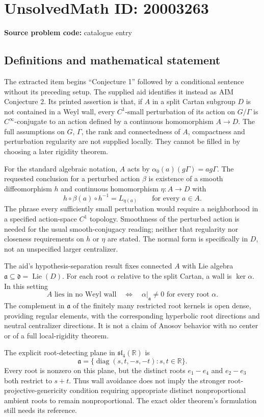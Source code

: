 \documentclass[11pt]{article}
\newcommand{\R}{\mathbb{R}}
\begin{document}
\section*{UnsolvedMath ID: 20003263}
\textbf{Source problem code:} catalogue entry
\subsection{Definitions and mathematical statement}
The extracted item begins ``Conjecture 1'' followed by a conditional sentence without its preceding setup. The supplied aid identifies it instead as AIM Conjecture 2. Its printed assertion is that, if $A$ in a split Cartan subgroup $D$ is not contained in a Weyl wall, every $C^1$-small perturbation of its action on $G/\Gamma$ is $C^\infty$-conjugate to an action defined by a continuous homomorphism $A\to D$. The full assumptions on $G$, $\Gamma$, the rank and connectedness of $A$, compactness and perturbation regularity are not supplied locally. They cannot be filled in by choosing a later rigidity theorem.

For the standard algebraic notation, $A$ acts by $\alpha_0(a)(g\Gamma)=ag\Gamma$. The requested conclusion for a perturbed action $\beta$ is existence of a smooth diffeomorphism $h$ and continuous homomorphism $\eta:A\to D$ with
\[
 h\circ\beta(a)\circ h^{-1}=L_{\eta(a)}
 \qquad\text{for every }a\in A.
\]
The phrase every sufficiently small perturbation would require a neighborhood in a specified action-space $C^1$ topology. Smoothness of the perturbed action is needed for the usual smooth-conjugacy reading; neither that regularity nor closeness requirements on $h$ or $\eta$ are stated. The normal form is specifically in $D$, not an unspecified larger centralizer.

The aid's hypothesis-separation result fixes connected $A$ with Lie algebra $\mathfrak a\subseteq\mathfrak d=\operatorname{Lie}(D)$. For each root $\alpha$ relative to the split Cartan, a wall is $\ker\alpha$. In this setting
\[
 A\text{ lies in no Weyl wall}
 \quad\Longleftrightarrow\quad
 \alpha|_{\mathfrak a}\ne0\text{ for every root }\alpha.
\]
The complement in $\mathfrak a$ of the finitely many restricted root kernels is open dense, providing regular elements, with the corresponding hyperbolic root directions and neutral centralizer directions. It is not a claim of Anosov behavior with no center or of a full local-rigidity theorem.

The explicit root-detecting plane in $\mathfrak{sl}_4(\R)$ is
\[
 \mathfrak a=\{\operatorname{diag}(s,t,-s,-t):s,t\in\R\}.
\]
Every root is nonzero on this plane, but the distinct roots $e_1-e_4$ and $e_2-e_3$ both restrict to $s+t$. Thus wall avoidance does not imply the stronger root-projective-genericity condition requiring appropriate distinct nonproportional ambient roots to remain nonproportional. The exact older theorem's formulation still needs its reference.
\end{document}
